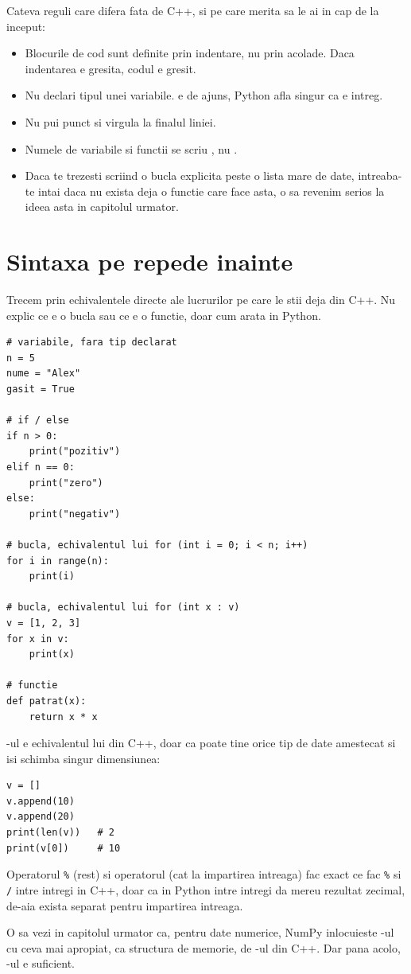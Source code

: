 Cateva reguli care difera fata de C++, si pe care merita sa le ai in cap
de la inceput:

\begin{itemize}
  \item Blocurile de cod sunt definite prin indentare, nu prin acolade.
    Daca indentarea e gresita, codul e gresit.
  \item Nu declari tipul unei variabile.  e de ajuns,
    Python afla singur ca  e intreg.
  \item Nu pui punct si virgula la finalul liniei.
  \item Numele de variabile si functii se scriu , nu
    .
  \item Daca te trezesti scriind o bucla explicita peste o lista mare de
    date, intreaba-te intai daca nu exista deja o functie care face
    asta, o sa revenim serios la ideea asta in capitolul urmator.
\end{itemize}

\section{Sintaxa pe repede inainte}

Trecem prin echivalentele directe ale lucrurilor pe care le stii deja din
C++. Nu explic ce e o bucla sau ce e o functie, doar cum arata in Python.

\begin{verbatim}
# variabile, fara tip declarat
n = 5
nume = "Alex"
gasit = True

# if / else
if n > 0:
    print("pozitiv")
elif n == 0:
    print("zero")
else:
    print("negativ")

# bucla, echivalentul lui for (int i = 0; i < n; i++)
for i in range(n):
    print(i)

# bucla, echivalentul lui for (int x : v)
v = [1, 2, 3]
for x in v:
    print(x)

# functie
def patrat(x):
    return x * x
\end{verbatim}

-ul e echivalentul lui  din C++, doar ca
poate tine orice tip de date amestecat si isi schimba singur dimensiunea:

\begin{verbatim}
v = []
v.append(10)
v.append(20)
print(len(v))   # 2
print(v[0])     # 10
\end{verbatim}

Operatorul \texttt{\%} (rest) si operatorul \pycode{//} (cat la
impartirea intreaga) fac exact ce fac \texttt{\%} si \texttt{/} intre
intregi in C++, doar ca in Python \pycode{/} intre intregi da mereu
rezultat zecimal, de-aia exista \pycode{//} separat pentru impartirea
intreaga.

O sa vezi in capitolul urmator ca, pentru date numerice, NumPy inlocuieste
-ul cu ceva mai apropiat, ca structura de memorie, de
-ul din C++. Dar pana acolo, -ul e suficient.
